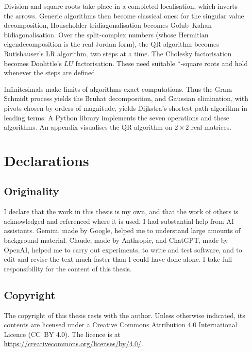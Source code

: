 \documentclass[12pt, a4paper]{report}
\theoremstyle{plain}
\theoremstyle{definition}
\theoremstyle{remark}
\theoremstyle{plain}
\begin{document}
Division and square roots take place in a completed localisation, which inverts the arrows. Generic algorithms then become classical ones: for the singular value decomposition, Householder tridiagonalisation becomes Golub--Kahan bidiagonalisation. Over the split-complex numbers (whose Hermitian eigendecomposition is the real Jordan form), the QR algorithm becomes Rutishauser's LR algorithm, two steps at a time. The Cholesky factorisation becomes Doolittle's $LU$ factorisation. These need suitable $*$-square roots and hold whenever the steps are defined.

Infinitesimals make limits of algorithms exact computations. Thus the Gram--Schmidt process yields the Bruhat decomposition, and Gaussian elimination, with pivots chosen by orders of magnitude, yields Dijkstra's shortest-path algorithm in leading terms. A Python library implements the seven operations and these algorithms. An appendix visualises the QR algorithm on $2\times 2$ real matrices.

\cleardoublepage

\chapter*{Declarations}
\section*{Originality}
I declare that the work in this thesis is my own, and that the work of others is acknowledged and referenced where it is used. I had substantial help from AI assistants. Gemini, made by Google, helped me to understand large amounts of background material. Claude, made by Anthropic, and ChatGPT, made by OpenAI, helped me to carry out experiments, to write and test software, and to edit and revise the text much faster than I could have done alone. I take full responsibility for the content of this thesis.

\section*{Copyright}
The copyright of this thesis rests with the author. Unless otherwise indicated, its contents are licensed under a Creative Commons Attribution 4.0 International Licence (CC~BY 4.0). The licence is at \url{https://creativecommons.org/licenses/by/4.0/}.
\end{document}

